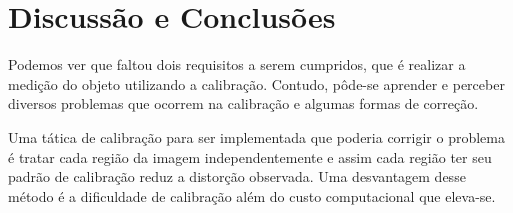 \section{Discussão e Conclusões}
\label{conclusao}


Podemos ver que faltou dois requisitos a serem cumpridos, que é realizar a medição do objeto utilizando a calibração.
Contudo, pôde-se aprender e perceber diversos problemas que ocorrem na calibração e algumas formas de correção. 

Uma tática de calibração para ser implementada que poderia corrigir o problema é tratar cada região da imagem independentemente e assim cada região ter seu padrão de calibração reduz a distorção observada. Uma desvantagem desse método é a dificuldade de calibração além do custo computacional que eleva-se.